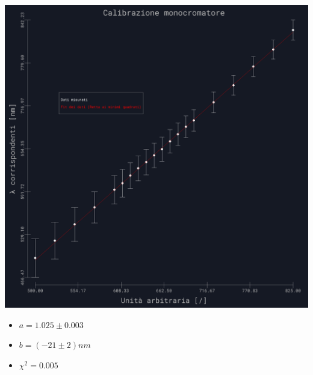 \documentclass{article}
\begin{document}
\begin{center}
    \begin{minipage}{0.6\textwidth} %
        \centering
        \includegraphics[width=1\linewidth]{../images/grafico14.png} %
        \label{grafico:14}
    \end{minipage}
    \hfill %
    \begin{minipage}{0.25\textwidth}    
    \begin{itemize}
        \item $a=1.025\pm0.003$
        \item $b=(-21\pm2) nm$
        \item $\chi^2=0.005$
    \end{itemize}
    \end{minipage}
\end{center}
\newpage
\end{document}
